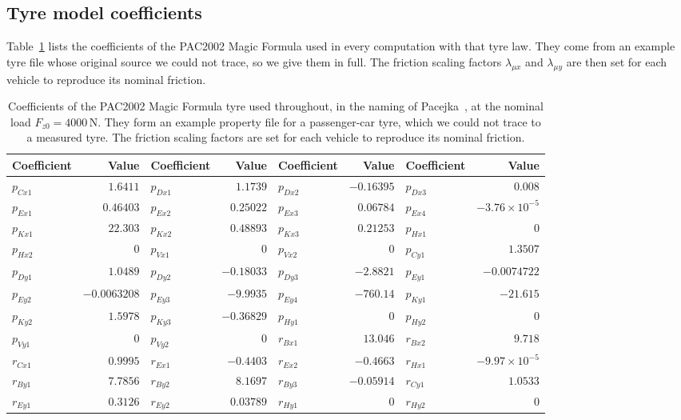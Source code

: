 \documentclass[12pt, twoside]{amsart}
\theoremstyle{definition}
\begin{document}
\subsection{Tyre model coefficients}

Table~\ref{tab:app-mf} lists the coefficients of the PAC2002 Magic Formula used in every computation
with that tyre law. They come from an example tyre file whose original source we could not trace, so
we give them in full. The friction scaling factors $\lambda_{\mu x}$ and $\lambda_{\mu y}$ are then set
for each vehicle to reproduce its nominal friction.

\begin{table}[htbp]
\centering\small
\setlength{\tabcolsep}{3pt}
\caption{Coefficients of the PAC2002 Magic Formula tyre used throughout, in the naming of Pacejka~\cite{Pacejka2012}, at the nominal load $F_{z0}=4000$\,N. They form an example property file for a passenger-car tyre, which we could not trace to a measured tyre. The friction scaling factors are set for each vehicle to reproduce its nominal friction.}\label{tab:app-mf}
\begin{tabular}{lrlrlrlr}
\toprule
Coefficient & Value & Coefficient & Value & Coefficient & Value & Coefficient & Value\\
\midrule
$p_{Cx1}$ & $1.6411$ & $p_{Dx1}$ & $1.1739$ & $p_{Dx2}$ & $-0.16395$ & $p_{Dx3}$ & $0.008$\\
$p_{Ex1}$ & $0.46403$ & $p_{Ex2}$ & $0.25022$ & $p_{Ex3}$ & $0.06784$ & $p_{Ex4}$ & $-3.76\times10^{-5}$\\
$p_{Kx1}$ & $22.303$ & $p_{Kx2}$ & $0.48893$ & $p_{Kx3}$ & $0.21253$ & $p_{Hx1}$ & $0$\\
$p_{Hx2}$ & $0$ & $p_{Vx1}$ & $0$ & $p_{Vx2}$ & $0$ & $p_{Cy1}$ & $1.3507$\\
$p_{Dy1}$ & $1.0489$ & $p_{Dy2}$ & $-0.18033$ & $p_{Dy3}$ & $-2.8821$ & $p_{Ey1}$ & $-0.0074722$\\
$p_{Ey2}$ & $-0.0063208$ & $p_{Ey3}$ & $-9.9935$ & $p_{Ey4}$ & $-760.14$ & $p_{Ky1}$ & $-21.615$\\
$p_{Ky2}$ & $1.5978$ & $p_{Ky3}$ & $-0.36829$ & $p_{Hy1}$ & $0$ & $p_{Hy2}$ & $0$\\
$p_{Vy1}$ & $0$ & $p_{Vy2}$ & $0$ & $r_{Bx1}$ & $13.046$ & $r_{Bx2}$ & $9.718$\\
$r_{Cx1}$ & $0.9995$ & $r_{Ex1}$ & $-0.4403$ & $r_{Ex2}$ & $-0.4663$ & $r_{Hx1}$ & $-9.97\times10^{-5}$\\
$r_{By1}$ & $7.7856$ & $r_{By2}$ & $8.1697$ & $r_{By3}$ & $-0.05914$ & $r_{Cy1}$ & $1.0533$\\
$r_{Ey1}$ & $0.3126$ & $r_{Ey2}$ & $0.03789$ & $r_{Hy1}$ & $0$ & $r_{Hy2}$ & $0$\\
\bottomrule
\end{tabular}
\end{table}
\FloatBarrier
\end{document}
